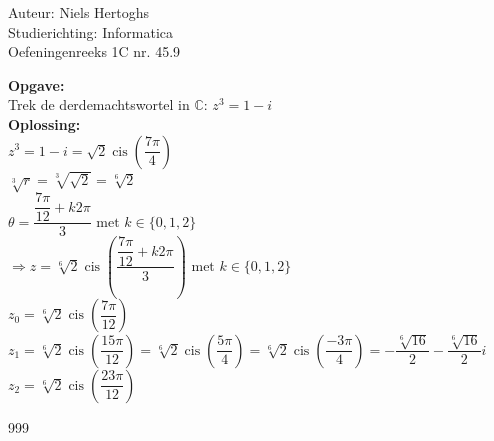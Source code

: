 \documentclass[a4paper]{article}
\newcommand{\cis}{\operatorname{cis}}
\begin{document}
  
\noindent \large Auteur: Niels Hertoghs \\
\noindent \large Studierichting: Informatica\\
\noindent \large Oefeningenreeks 1C nr. 45.9\\

\medskip

\normalsize

\textbf{Opgave:} \\

Trek de derdemachtswortel in $\mathbb{C}$: $z^3 = 1-i$ \\

\textbf{Oplossing:} \\

$z^3 = 1-i = \sqrt{2} \cis \left(\dfrac{7\pi}{4}\right)$ \\

$\sqrt[3]{r} = \sqrt[3]{\sqrt{2}} = \sqrt[6]{2}$\\

$\theta = \dfrac{\dfrac{7\pi}{12}+k2\pi}{3} \text{ met } k \in \{0,1,2\}$\\

$\Rightarrow z = \sqrt[6]{2} \cis\left(\dfrac{\dfrac{7\pi}{12}+k2\pi}{3}\right) \text{ met } k \in \{0,1,2\}$ \\

$z_0 = \sqrt[6]{2} \cis\left(\dfrac{7\pi}{12}\right)$ \\

$z_1 = \sqrt[6]{2} \cis\left(\dfrac{15\pi}{12}\right)  = \sqrt[6]{2} \cis\left(\dfrac{5\pi}{4}\right) = \sqrt[6]{2} \cis\left(\dfrac{-3\pi}{4}\right) = -\dfrac{\sqrt[6]{16}}{2}-\dfrac{\sqrt[6]{16}}{2}i$ \\

$z_2 = \sqrt[6]{2} \cis\left(\dfrac{23\pi}{12}\right)$ \\

\begin{thebibliography}{999}
\end{thebibliography}
\end{document}
